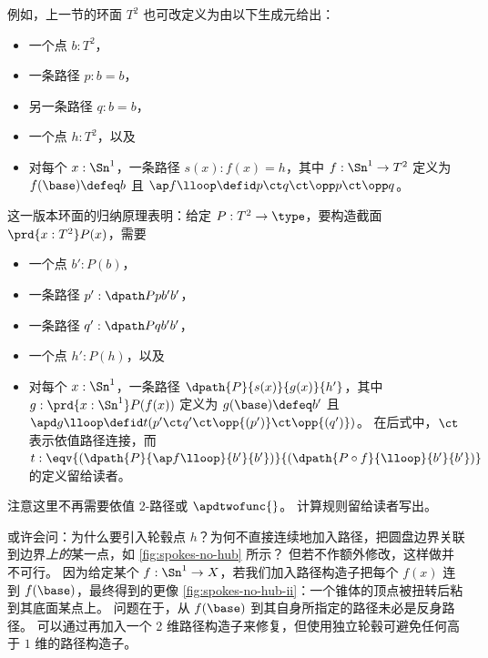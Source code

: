 例如，上一节的环面 $T^2$ 也可改定义为由以下生成元给出：
\begin{itemize}
\item 一个点 $b:T^2$，
\item 一条路径 $p:b=b$，
\item 另一条路径 $q:b=b$，
\item 一个点 $h:T^2$，以及
\item 对每个 $x:\Sn^1$，一条路径 $s(x) : f(x)=h$，其中 $f:\Sn^1\to T^2$ 定义为 $f(\base)\defeq b$ 且 $\ap f \lloop \defid p \ct q \ct \opp p \ct \opp q$。
\end{itemize}
这一版本环面的归纳原理表明：给定 $P:T^2\to\type$，要构造截面 $\prd{x:T^2} P(x)$，需要
\begin{itemize}
\item 一个点 $b':P(b)$，
\item 一条路径 $p' : \dpath P p {b'} {b'}$，
\item 一条路径 $q' : \dpath P q {b'} {b'}$，
\item 一个点 $h':P(h)$，以及
\item 对每个 $x:\Sn^1$，一条路径 $\dpath {P}{s(x)}{g(x)}{h'}$，其中 $g:\prd{x:\Sn^1} P(f(x))$ 定义为 $g(\base)\defeq b'$ 且 $\apd g \lloop \defid t(p' \ct q' \ct \opp{(p')} \ct \opp{(q')})$。
  在后式中，$\ct$ 表示依值路径连接，而 $t:\eqv{(\dpath{P}{\ap f \lloop}{b'}{b'})}{(\dpath{P\circ f}{\lloop}{b'}{b'})}$ 的定义留给读者。
\end{itemize}
注意这里不再需要依值 2-路径或 $\apdtwofunc{}$。
计算规则留给读者写出。

\begin{rmk}\label{rmk:spokes-no-hub}
或许会问：为什么要引入轮毂点 $h$？为何不直接连续地加入路径，把圆盘边界关联到边界\emph{上的}某一点，如 \cref{fig:spokes-no-hub} 所示？
但若不作额外修改，这样做并不可行。
因为给定某个 $f:\Sn^1 \to X$，若我们加入路径构造子把每个 $f(x)$ 连到 $f(\base)$，最终得到的更像 \cref{fig:spokes-no-hub-ii}：一个锥体的顶点被扭转后粘到其底面某点上。
问题在于，从 $f(\base)$ 到其自身所指定的路径未必是反身路径。
可以通过再加入一个 2 维路径构造子来修复，但使用独立轮毂可避免任何高于 $1$ 维的路径构造子。
\end{rmk}

